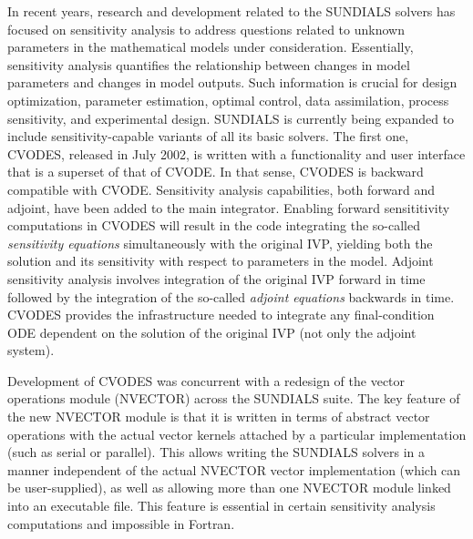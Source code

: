 In recent years, research and development related to the SUNDIALS solvers has
focused on sensitivity analysis to address questions related to unknown 
parameters in the mathematical models under consideration.
Essentially, sensitivity analysis quantifies the relationship between
changes in model parameters and changes in model outputs. Such information 
is crucial for design optimization, parameter estimation, optimal control, data
assimilation, process sensitivity, and experimental design.
SUNDIALS is currently being expanded to include sensitivity-capable variants of all
its basic solvers. The first one, CVODES, released in July 2002, 
is written with a functionality and user interface that is a superset of that of CVODE. 
In that sense, CVODES is backward compatible with CVODE.
Sensitivity analysis capabilities, both forward and adjoint, have been added to 
the main integrator. Enabling forward sensititivity computations 
in CVODES will result in the code integrating the so-called 
{\em sensitivity equations} simultaneously with the original IVP, 
yielding both the solution and its sensitivity with respect to parameters in the model. 
Adjoint sensitivity analysis involves integration of the 
original IVP forward in time followed by the integration of the so-called 
{\em adjoint equations} backwards in time. 
CVODES provides the infrastructure needed to integrate any final-condition ODE
dependent on the solution of the original IVP (not only the adjoint system). 

Development of CVODES was concurrent with a redesign of the vector operations module 
(NVECTOR) across the SUNDIALS suite. The key feature of the new NVECTOR module is that it
is written in terms of abstract vector operations with the actual vector kernels attached
by a particular implementation (such as serial or parallel). This allows
writing the SUNDIALS solvers in a manner independent of the actual NVECTOR vector
implementation (which can be user-supplied), as well as allowing more than one 
NVECTOR module linked into an executable file. This feature is essential in certain
sensitivity analysis computations and impossible in Fortran.

